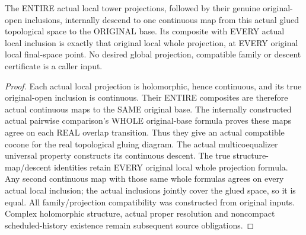 \begin{theorem}
\label{hir:original-input-local-terminal-glued-whole-continuous-projection}
\leanok
The ENTIRE actual local tower projections, followed by their genuine
original-open inclusions, internally descend to one continuous map from
this actual glued topological space to the ORIGINAL base. Its composite
with EVERY actual local inclusion is exactly that original local whole
projection, at EVERY original local final-space point. No desired global
projection, compatible family or descent certificate is a caller input.
\end{theorem}
\begin{proof}
Each actual local projection is holomorphic, hence continuous, and its
true original-open inclusion is continuous. Their ENTIRE composites
are therefore actual continuous maps to the SAME original base. The
internally constructed actual pairwise comparison's WHOLE original-base
formula proves these maps agree on each REAL overlap transition. Thus
they give an actual compatible cocone for the real topological gluing
diagram. The actual multicoequalizer universal property constructs its
continuous descent. The true structure-map/descent identities retain
EVERY original local whole projection formula. Any second continuous
map with those same whole formulas agrees on every actual local inclusion;
the actual inclusions jointly cover the glued space, so it is equal.
All family/projection compatibility was constructed from original inputs.
Complex holomorphic structure, actual proper resolution and noncompact
scheduled-history existence remain subsequent source obligations.
\end{proof}

